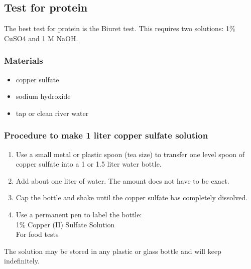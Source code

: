 \subsection{Test for protein}

The best test for protein is the Biuret test. This requires two solutions: 1\% CuSO4 and 1 M NaOH.

\subsubsection{Materials}
\begin{itemize}
\item{copper sulfate}
\item{sodium hydroxide}
\item{tap or clean river water}
\end{itemize}

\subsubsection{Procedure to make 1 liter copper sulfate solution}
\begin{enumerate}
\item{Use a small metal or plastic spoon (tea size) to transfer one level spoon of copper sulfate into a 1 or 1.5 liter water bottle.}
\item{Add about one liter of water. The amount does not have to be exact.}
\item{Cap the bottle and shake until the copper sulfate has completely dissolved.}
\item{Use a permanent pen to label the bottle:\\
1\% Copper (II) Sulfate Solution\\
For food tests}
\end{enumerate}

The solution may be stored in any plastic or glass bottle and will keep indefinitely.

